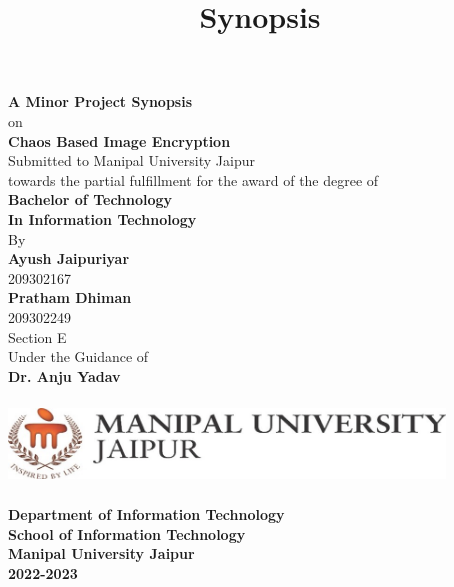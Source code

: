 \documentclass[11pt,a4paper,english]{article}
\begin{document}
\title{Synopsis}
\begin{titlepage}
    \begin{center}
        \LARGE
        \textbf{A Minor Project Synopsis}\\
        on\\
        \Huge
        \textbf{Chaos Based Image Encryption}\\
        \vspace{0.5cm}
        \Large
        Submitted to Manipal University Jaipur\\
        towards the partial fulfillment for the award of the degree of\\
        \vspace{0.5cm}
        \LARGE
        \textbf{Bachelor of Technology}\\
        \textbf{In Information Technology}\\
        \vspace{0.5cm}
        \large
        By\\
        \Large
        \textbf{Ayush Jaipuriyar}\\
        209302167\\
        \textbf{Pratham Dhiman}\\
        209302249\\
        Section E\\
        \vspace{0.5cm}
        \large
        Under the Guidance of\\
        \Large
        \textbf{Dr. Anju Yadav }

        \vfill

        \includegraphics[width=11.58cm,height=2.28cm]{./logo}

        \LARGE
        \textbf{Department of Information Technology}\\
        \textbf{School of Information Technology }\\
        \textbf{Manipal University Jaipur}\\
        \Large
        \textbf{2022-2023}

    \end{center}
\end{titlepage}
\newpage
\date{}
\title{}
\maketitle
\tableofcontents
\newpage
\end{document}
